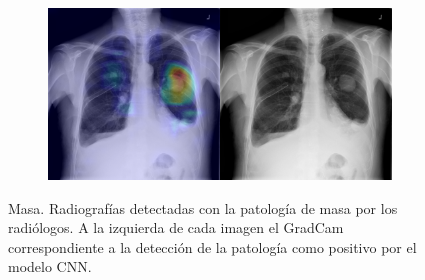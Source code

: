 \begin{figure}[b]
\begin{subfigure}{0.4\textwidth}
    \end{subfigure}
    \begin{subfigure}{0.4\textwidth}
        \centering
        \includegraphics[width=1.0\textwidth]{Chapters/5. Conclusiones/img/Mass/1_1_00022837_011.png}
    \end{subfigure}

    \caption[short]{Masa. Radiografías detectadas con la patología de masa por los
                    radiólogos. A la izquierda de cada imagen el GradCam correspondiente a la detección
                    de la patología como positivo por el modelo CNN.}
\end{figure}

